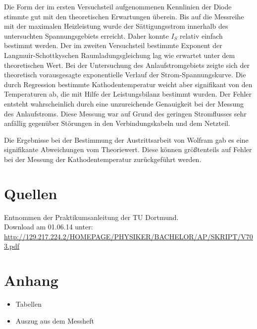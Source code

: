 \documentclass[11pt,ngerman,a4paper]{article}
\begin{document}
Die Form der im ersten Versuchsteil aufgenommenen Kennlinien der Diode stimmte gut mit den theoretischen Erwartungen überein. Bis auf die Messreihe mit der maximalen Heizleistung wurde der S\"attigungsstrom innerhalb des untersuchten Spannungsgebiets erreicht. Daher konnte $I_S$ relativ einfach bestimmt werden. Der im zweiten Versuchsteil bestimmte Exponent der Langmuir-Schottkyschen Raumladungsgleichung lag wie erwartet unter dem theoretischen Wert. Bei der Untersuchung des Anlaufstromgebiets zeigte sich der theoretisch vorausgesagte exponentielle Verlauf der Strom-Spannungskurve. Die durch Regression bestimmte Kathodentemperatur weicht aber signifikant von den Temperaturen ab, die mit Hilfe der Leistungsbilanz bestimmt wurden. Der Fehler entsteht wahrscheinlich durch eine unzureichende Genauigkeit bei der Messung des Anlaufstroms. Diese Messung war auf Grund des geringen Stromflusses sehr anf\"allig gegen\"uber St\"orungen in den Verbindungskabeln und dem Netzteil. 

\noindent
Die Ergebnisse bei der Bestimmung der Austrittsarbeit von Wolfram gab es eine signifikante Abweichungen vom Theoriewert. Diese k\"onnen gr\"o\ss tenteils auf Fehler bei der Messung der Kathodentemperatur zur\"uckgef\"uhrt werden.
\section{Quellen}
\begin{enumerate}[{[}1{]}]
\item Entnommen der Praktikumsanleitung \textit{} der TU Dortmund. \\
Download am 01.06.14 unter:\\
 \url{http://129.217.224.2/HOMEPAGE/PHYSIKER/BACHELOR/AP/SKRIPT/V703.pdf}
\end{enumerate}

\section{Anhang}
\begin{itemize}
\item Tabellen
\item Auszug aus dem Messheft
\end{itemize}
\newpage
\end{document}
